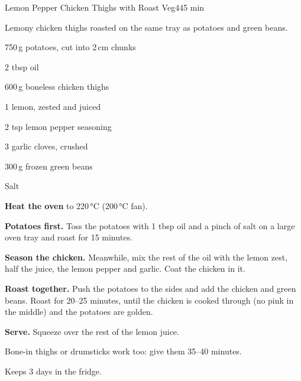 \begin{recipebox}{Lemon Pepper Chicken Thighs with Roast Veg}{4}{45 min}

Lemony chicken thighs roasted on the same tray as potatoes and green beans.

\begin{ingredients}
  \item 750\,g potatoes, cut into 2\,cm chunks
  \item 2 tbsp oil
  \item 600\,g boneless chicken thighs
  \item 1 lemon, zested and juiced
  \item 2 tsp lemon pepper seasoning
  \item 3 garlic cloves, crushed
  \item 300\,g frozen green beans
  \item Salt
\end{ingredients}

\begin{method}
  \item \textbf{Heat the oven} to 220\,°C (200\,°C fan).
  \item \textbf{Potatoes first.} Toss the potatoes with 1 tbsp oil and a pinch of
        salt on a large oven tray and roast for 15 minutes.
  \item \textbf{Season the chicken.} Meanwhile, mix the rest of the oil with the
        lemon zest, half the juice, the lemon pepper and garlic. Coat the chicken
        in it.
  \item \textbf{Roast together.} Push the potatoes to the sides and add the chicken
        and green beans. Roast for 20--25 minutes, until the chicken is cooked
        through (no pink in the middle) and the potatoes are golden.
  \item \textbf{Serve.} Squeeze over the rest of the lemon juice.
\end{method}

\begin{notelist}
  \item Bone-in thighs or drumsticks work too: give them 35--40 minutes.
  \item Keeps 3 days in the fridge.
\end{notelist}

\end{recipebox}
